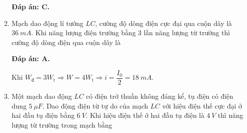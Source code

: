 \begin{enumerate}[label=\bfseries Câu \arabic*:]
{		
	}
	
	\hideall
	{		\textbf{Đáp án: C.}
		
		
		
	}
		\item {}
	
	{
		Mạch dao động lí tưởng $LC$, cường độ dòng điện cực đại qua cuộn dây là $\SI{36}{mA}$. Khi năng lượng điện trường bằng 3 lần năng lượng từ trường thì cường độ dòng điện qua cuộn dây là
		
	}
	
	\hideall
	{		\textbf{Đáp án: A.}
		
		Khi $W_\text{đ} = 3W_\text{t} \Rightarrow W = 4W_\text{t} \Rightarrow i = \dfrac{I_0}{2} = \SI{18}{mA}.$
		
	}
		\item {}
	
	{
		Một mạch dao động $LC$ có điện trở thuần không đáng kể, tụ điện có điện dung $\SI{5}{\mu F}$. Dao động điện từ tự do của mạch $LC$ với hiệu điện thế cực đại ở hai đầu tụ điện bằng $\SI{6}{V}$. Khi hiệu điện thế ở hai đầu tụ điện là $\SI{4}{V}$ thì năng lượng từ trường trong mạch bằng
		
	}
	

\end{enumerate}
